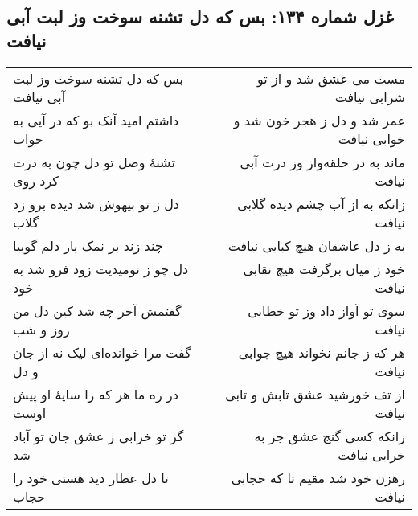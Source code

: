 \begin{center}
\section*{غزل شماره ۱۳۴: بس که دل تشنه سوخت وز لبت آبی نیافت}
\label{sec:134}
\begin{longtable}{l p{0.5cm} r}
بس که دل تشنه سوخت وز لبت آبی نیافت
&&
مست می عشق شد و از تو شرابی نیافت
\\
داشتم امید آنک بو که در آیی به خواب
&&
عمر شد و دل ز هجر خون شد و خوابی نیافت
\\
تشنهٔ وصل تو دل چون به درت کرد روی
&&
ماند به در حلقه‌وار وز درت آبی نیافت
\\
دل ز تو بیهوش شد دیده برو زد گلاب
&&
زانکه به از آب چشم دیده گلابی نیافت
\\
چند زند بر نمک یار دلم گوییا
&&
به ز دل عاشقان هیچ کبابی نیافت
\\
دل چو ز نومیدیت زود فرو شد به خود
&&
خود ز میان برگرفت هیچ نقابی نیافت
\\
گفتمش آخر چه شد کین دل من روز و شب
&&
سوی تو آواز داد وز تو خطابی نیافت
\\
گفت مرا خوانده‌ای لیک نه از جان و دل
&&
هر که ز جانم نخواند هیچ جوابی نیافت
\\
در ره ما هر که را سایهٔ او پیش اوست
&&
از تف خورشید عشق تابش و تابی نیافت
\\
گر تو خرابی ز عشق جان تو آباد شد
&&
زانکه کسی گنج عشق جز به خرابی نیافت
\\
تا دل عطار دید هستی خود را حجاب
&&
رهزن خود شد مقیم تا که حجابی نیافت
\\
\end{longtable}
\end{center}
